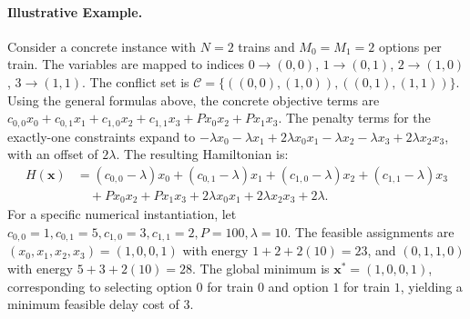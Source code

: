 \documentclass[12pt]{article}
\begin{document}
\paragraph{Illustrative Example.}
Consider a concrete instance with $N=2$ trains and $M_0=M_1=2$ options per train. The variables are mapped to indices $0 \to (0,0)$, $1 \to (0,1)$, $2 \to (1,0)$, $3 \to (1,1)$. The conflict set is $\mathcal{C} = \{((0,0),(1,0)), ((0,1),(1,1))\}$. Using the general formulas above, the concrete objective terms are $c_{0,0}x_0 + c_{0,1}x_1 + c_{1,0}x_2 + c_{1,1}x_3 + P x_0 x_2 + P x_1 x_3$. The penalty terms for the exactly-one constraints expand to $-\lambda x_0 - \lambda x_1 + 2\lambda x_0 x_1 - \lambda x_2 - \lambda x_3 + 2\lambda x_2 x_3$, with an offset of $2\lambda$. The resulting Hamiltonian is:
\begin{align}
H(\mathbf{x}) &= (c_{0,0}-\lambda)x_0 + (c_{0,1}-\lambda)x_1 + (c_{1,0}-\lambda)x_2 + (c_{1,1}-\lambda)x_3 \nonumber \\
&\quad + P x_0 x_2 + P x_1 x_3 + 2\lambda x_0 x_1 + 2\lambda x_2 x_3 + 2\lambda.
\end{align}
For a specific numerical instantiation, let $c_{0,0}=1, c_{0,1}=5, c_{1,0}=3, c_{1,1}=2, P=100, \lambda=10$. The feasible assignments are $(x_0,x_1,x_2,x_3) = (1,0,0,1)$ with energy $1+2 + 2(10) = 23$, and $(0,1,1,0)$ with energy $5+3 + 2(10) = 28$. The global minimum is $\mathbf{x}^* = (1,0,0,1)$, corresponding to selecting option $0$ for train $0$ and option $1$ for train $1$, yielding a minimum feasible delay cost of $3$.
\end{document}
